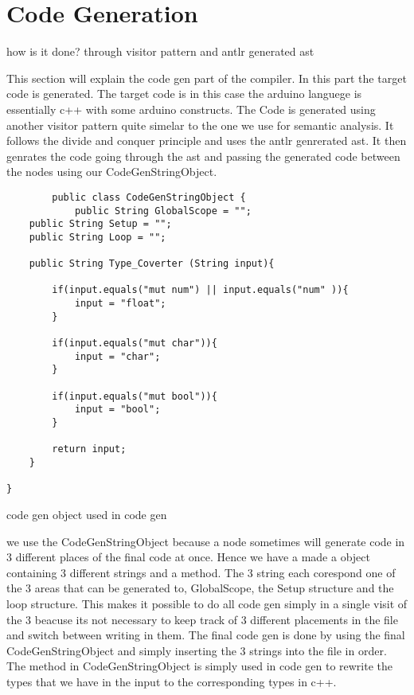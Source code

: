 \section{Code Generation}

how is it done? through visitor pattern and antlr generated ast


This section will explain the code gen part of the compiler. In this part the target
code is generated. The target code is in this case the arduino languege is essentially c++ with some arduino constructs. The Code is generated using another visitor pattern quite simelar to the one we use for semantic analysis. It follows the divide and conquer principle and uses the antlr genrerated ast. It then genrates the code going through the ast and passing the generated code between the nodes using our CodeGenStringObject.

\begin{listing}[htb!]
    \begin{verbatim}
        public class CodeGenStringObject {
            public String GlobalScope = "";
    public String Setup = "";
    public String Loop = "";

    public String Type_Coverter (String input){
        
        if(input.equals("mut num") || input.equals("num" )){
            input = "float";
        }
        
        if(input.equals("mut char")){
            input = "char";
        }

        if(input.equals("mut bool")){
            input = "bool";
        }
        
        return input;
    }
    
}
\end{verbatim}
\caption{code gen object used in code gen}
\label{lst:code gen object}
\end{listing}

we use the CodeGenStringObject because a node sometimes will generate code in 3 different places of the final code at once. Hence we have a made a object containing 3 different strings and a method. The 3 string each corespond one of the 3 areas that can be generated to, GlobalScope, the Setup structure and the loop structure. This makes it possible to do all code gen simply in a single visit of the 3 beacuse its not necessary to keep track of 3 different placements in the file and switch between writing in them. The final code gen is done by using the final CodeGenStringObject and simply inserting the 3 strings into the file in order.  The method in CodeGenStringObject is simply used in code gen to rewrite the types that we have in the input to the corresponding types in c++.

